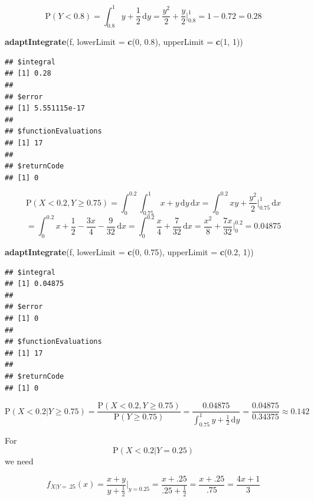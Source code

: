 \documentclass[
]{book}
\newenvironment{Shaded}{\begin{snugshade}}{\end{snugshade}}
\newcommand{\DataTypeTok}[1]{\textcolor[rgb]{0.13,0.29,0.53}{#1}}
\newcommand{\DecValTok}[1]{\textcolor[rgb]{0.00,0.00,0.81}{#1}}
\newcommand{\FloatTok}[1]{\textcolor[rgb]{0.00,0.00,0.81}{#1}}
\newcommand{\KeywordTok}[1]{\textcolor[rgb]{0.13,0.29,0.53}{\textbf{#1}}}
\newcommand{\NormalTok}[1]{#1}
\begin{document}
\[
\mbox{P}(Y<0.8)=\int_{0.8}^1 y+\frac{1}{2}\,\mathrm{d}y = \frac{y^2}{2}+\frac{y}{2}\bigg|_{0.8}^1=1-0.72=0.28
\]

\begin{Shaded}
\begin{Highlighting}[]
\KeywordTok{adaptIntegrate}\NormalTok{(f, }\DataTypeTok{lowerLimit =} \KeywordTok{c}\NormalTok{(}\DecValTok{0}\NormalTok{, }\FloatTok{0.8}\NormalTok{), }\DataTypeTok{upperLimit =} \KeywordTok{c}\NormalTok{(}\DecValTok{1}\NormalTok{, }\DecValTok{1}\NormalTok{))}
\end{Highlighting}
\end{Shaded}

\begin{verbatim}
## $integral
## [1] 0.28
## 
## $error
## [1] 5.551115e-17
## 
## $functionEvaluations
## [1] 17
## 
## $returnCode
## [1] 0
\end{verbatim}

\[
\mbox{P}(X<0.2,Y\geq 0.75)=\int_0^{0.2}\int_{0.75}^1 x+y\,\mathrm{d}y \,\mathrm{d}x= \int_0^{0.2} xy+\frac{y^2}{2}\bigg|_{0.75}^1\,\mathrm{d}x 
\]
\[
=\int_0^{0.2} x+\frac{1}{2}-\frac{3x}{4}-\frac{9}{32}\,\mathrm{d}x = \int_0^{0.2} \frac{x}{4}+\frac{7}{32}\,\mathrm{d}x = \frac{x^2}{8}+\frac{7x}{32}\bigg|_0^{0.2}=0.04875
\]

\begin{Shaded}
\begin{Highlighting}[]
\KeywordTok{adaptIntegrate}\NormalTok{(f, }\DataTypeTok{lowerLimit =} \KeywordTok{c}\NormalTok{(}\DecValTok{0}\NormalTok{, }\FloatTok{0.75}\NormalTok{), }\DataTypeTok{upperLimit =} \KeywordTok{c}\NormalTok{(}\FloatTok{0.2}\NormalTok{, }\DecValTok{1}\NormalTok{))}
\end{Highlighting}
\end{Shaded}

\begin{verbatim}
## $integral
## [1] 0.04875
## 
## $error
## [1] 0
## 
## $functionEvaluations
## [1] 17
## 
## $returnCode
## [1] 0
\end{verbatim}

\[
\mbox{P}(X<0.2|Y\geq 0.75)=\frac{\mbox{P}(X<0.2,Y\geq 0.75)}{\mbox{P}(Y\geq 0.75)}=\frac{0.04875}{\int_{0.75}^1 y+\frac{1}{2}\,\mathrm{d}y}=\frac{0.04875}{0.34375} \approx 0.142
\]

For
\[
\mbox{P}(X<0.2|Y= 0.25) 
\]
we need

\[
f_{X|Y=.25}(x)=\frac{x+y}{y+\frac{1}{2}}\bigg|_{y=0.25}=\frac{x+.25}{.25+\frac{1}{2}}=\frac{x+.25}{.75}=\frac{4x+1}{3}
\]
\end{document}
